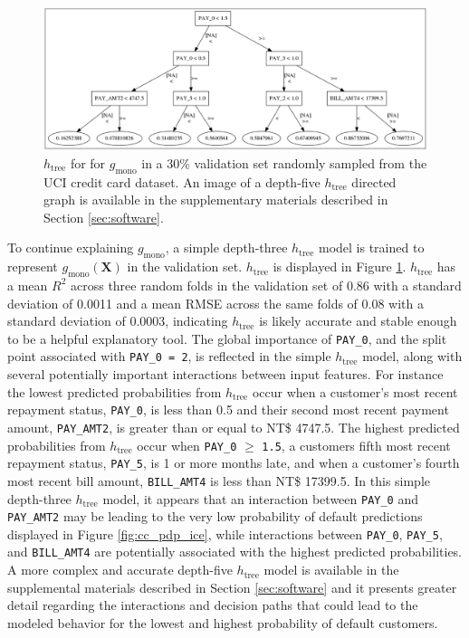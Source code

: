 \documentclass[11pt]{asaproc}
\begin{document}
\vspace{10pt}

\begin{figure}[htb]
	\begin{center}
		\includegraphics[scale=0.3]{img/figure_9.eps}
		\caption{$h_{\text{tree}}$ for for $g_{\text{mono}}$ in a 30\% validation set randomly sampled from the UCI credit card dataset. An image of a depth-five $h_{\text{tree}}$ directed graph is available in the supplementary materials described in Section \ref{sec:software}.}
		\label{fig:cc_dt_surrogate}
	\end{center}
\end{figure}

To continue explaining $g_{\text{mono}}$, a simple depth-three $h_{\text{tree}}$ model is trained to represent  $g_{\text{mono}}(\mathbf{X})$ in the validation set. $h_{\text{tree}}$ is displayed in Figure \ref{fig:cc_dt_surrogate}. $h_{\text{tree}}$ has a mean $R^2$ across three random folds in the validation set of 0.86 with a standard deviation of 0.0011 and a mean RMSE across the same folds of 0.08 with a standard deviation of 0.0003, indicating $h_{\text{tree}}$ is likely accurate and stable enough to be a helpful explanatory tool. The global importance of \texttt{PAY\_0}, and the split point associated with \texttt{PAY\_0 = 2}, is reflected in the simple $h_{\text{tree}}$ model, along with several potentially important interactions between input features. For instance the lowest predicted probabilities from $h_{\text{tree}}$ occur when a customer's  most recent repayment status, \texttt{PAY\_0}, is less than 0.5 and their second most recent payment amount, \texttt{PAY\_AMT2}, is greater than or equal to NT\$ 4747.5. The highest predicted probabilities from $h_{\text{tree}}$ occur when \texttt{PAY\_0} $\geq$ \texttt{1.5}, a customers fifth most recent repayment status, \texttt{PAY\_5}, is 1 or more months late, and when a customer's fourth most recent bill amount, \texttt{BILL\_AMT4} is less than NT\$ 17399.5. In this simple depth-three $h_{\text{tree}}$ model, it appears that an interaction between \texttt{PAY\_0} and \texttt{PAY\_AMT2} may be leading to the very low probability of default predictions displayed in Figure \ref{fig:cc_pdp_ice}, while interactions between \texttt{PAY\_0}, \texttt{PAY\_5}, and \texttt{BILL\_AMT4} are potentially associated with the highest predicted probabilities. A more complex and accurate depth-five $h_{\text{tree}}$ model is available in the supplemental materials described in Section \ref{sec:software} and it presents greater detail regarding the interactions and decision paths that could lead to the modeled behavior for the lowest and highest probability of default customers. 
 
\end{document}
